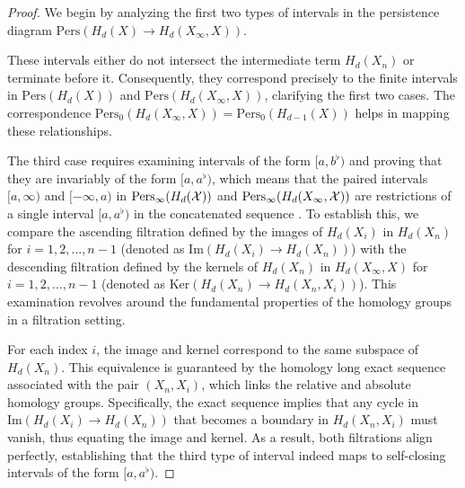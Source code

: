 \begin{proof}
	We begin by analyzing the first two types of intervals in the persistence diagram
	$\mathrm{Pers}(H_{d}(X) \to H_{d}(X_{\infty}, X))$.
	
	These intervals either do
	not intersect the intermediate term $H_{d}(X_{n})$ or terminate before it. Consequently,
	they correspond precisely to the finite intervals in $\mathrm{Pers}(H_{d}(X))$
	and $\mathrm{Pers}(H_{d}(X_{\infty}, X))$, clarifying the first two cases. The
	correspondence
	$\mathrm{Pers}_{0}(H_{d}(X_{\infty}, X)) = \mathrm{Pers}_{0}(H_{d-1}(X))$
	helps in mapping these relationships.

	The third case requires examining intervals of the form $[a, b^{\flat})$ and
	proving that they are invariably of the form $[a, a^{\flat})$, which means that
	the paired intervals $[a,\infty)$ and $[-\infty,a)$ in $\mathrm{Pers}_{\infty}(
	H_{d}({\mathcal{X}}))$ and $\mathrm{Pers}_{\infty}(H_{d}(X_{\infty}, {\mathcal{X}}))$ are restrictions
	of a single interval $[a,a^{\flat})$ in the concatenated sequence \cite[p.6]{de2011dualities}.
	To establish this, we compare the ascending filtration defined by the images of
	$H_{d}(X_{i})$ in $H_{d}(X_{n})$ for $i = 1, 2, \ldots, n-1$ (denoted as
	$\text{Im}(H_{d}(X_{i}) \to H_{d}(X_{n}))$) with the descending filtration defined
	by the kernels of $H_{d}(X_{n})$ in $H_{d}(X_{\infty}, X)$ for $i = 1, 2, \ldots
	, n-1$ (denoted as $\text{Ker}(H_{d}(X_{n}) \to H_{d}(X_{n}, X_{i}))$). This
	examination revolves around the fundamental properties of the homology groups
	in a filtration setting.

	For each index $i$, the image and kernel correspond to the same subspace of $H_{d}
	(X_{n})$. This equivalence is guaranteed by the homology long exact sequence
	associated with the pair $(X_{n}, X_{i})$, which links the relative and absolute
	homology groups. Specifically, the exact sequence implies that any cycle in $\text{Im}
	(H_{d}(X_{i}) \to H_{d}(X_{n}))$ that becomes a boundary in $H_{d}(X_{n}, X_{i}
	)$ must vanish, thus equating the image and kernel. As a result, both
	filtrations align perfectly, establishing that the third type of interval indeed
	maps to self-closing intervals of the form $[a, a^{\flat})$.
\end{proof}

